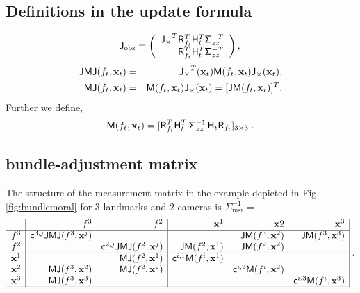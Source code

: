 \documentclass[conference]{IEEEtran}
\newcommand{\meas}{\mathsf{\Sigma^{-1}_\mathrm{msr}}}
\newcommand{\sigmazz}{\mathsf{\Sigma^{-1}_\mathnormal{zz}}}
\newcommand{\JMJ}{\mathsf{JMJ}}
\newcommand{\JM}{\mathsf{JM}}
\newcommand{\MJ}{\mathsf{MJ}}
\newcommand{\beq}{\begin{equation}}
\newcommand{\eeq}{\end{equation}}
\newcommand{\beqar}{\begin{eqnarray}}
\newcommand{\eeqar}{\end{eqnarray}}
\begin{document}
\begin{appendix}
\subsection{Definitions in the update formula}
\label{app:updatedefs}
\beq
  {\sf J}_{\rm obs} =
   \left( \begin{array}{r}
        {\sf J_\times}^T {\sf R}^T_{f_t} {\sf H}_t^T \mathsf{\Sigma}_{zz}^{-T}\\
        {\sf R}^T_{f_t} {\sf H}_t^T \mathsf{\Sigma}_{zz}^{-T}
        \end{array} \right),\\
\eeq
\beqar
    \JMJ(f_t,{\bf x}_t) &=& {\sf J_\times}^T({\bf x}_t) {\sf M}(f_t,{\bf x}_t) {\sf J_\times}({\bf x}_t), \nonumber \\
    \MJ(f_t,{\bf x}_t) &=& {\sf M}(f_t,{\bf x}_t) {\sf J_\times}({\bf x}_t) = [\JM(f_t,{\bf x}_t)]^T. \nonumber
\eeqar
Further we define,
\beq
    {\sf M}(f_t,{\bf x}_t) = [{\sf R}_{f_t}^T{\sf H}_t^T \, \sigmazz \, {\sf H}_t {\sf R}_{f_t}]_{3\times 3}\;. \label{eq:NLnotation2}
\eeq

\subsection{bundle-adjustment matrix}
The structure of the measurement matrix in the example depicted in Fig.\ref{fig:bundlemoral} for 3 landmarks and 2 cameras
is $\meas=$
\beq
    \begin{array}{r|rr|rrr|}
        & f^3 & f^2 & {\bf x}^1 & {\bf x}2 & {\bf x}^3 \\
        \hline
       f^3 & {\sf c}^{3,j}\JMJ(f^3,{\bf x}^j) & & & \JM(f^3,{\bf x}^2) & \JM(f^3,{\bf x}^3) \\
       f^2 & & {\sf  c}^{2,j}\JMJ(f^2,{\bf x}^j) & \JM(f^2,{\bf x}^1) & \JM(f^2,{\bf x}^2) & \\
        \hline
       {\bf x}^1 &  & \MJ(f^2,{\bf x}^1) & {\sf c}^{i,1}{\sf M}(f^i,{\bf x}^1) & & \\
       {\bf x}^2 &  \MJ(f^3,{\bf x}^2) & \MJ(f^2,{\bf x}^2) & & {\sf c}^{i,2}{\sf  M}(f^i,{\bf x}^2) & \\
       {\bf x}^3 & \MJ(f^3,{\bf x}^3) & & & & {\sf c}^{i,3}{\sf M}(f^i,{\bf x}^3) \\
        \hline
    \end{array}
    \;. \nonumber
\eeq

\end{appendix}
\end{document}
